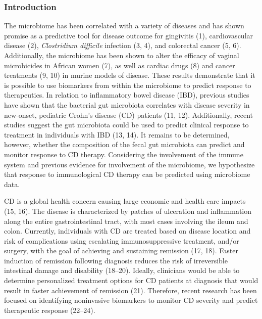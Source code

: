 \documentclass[12pt,]{article}
\begin{document}
\newpage

\subsubsection{Introduction}\label{introduction}

The microbiome has been correlated with a variety of diseases and has
shown promise as a predictive tool for disease outcome for gingivitis
(1), cardiovascular disease (2), \emph{Clostridium difficile} infection
(3, 4), and colorectal cancer (5, 6). Additionally, the microbiome has
been shown to alter the efficacy of vaginal microbicides in African
women (7), as well as cardiac drugs (8) and cancer treatments (9, 10) in
murine models of disease. These results demonstrate that it is possible
to use biomarkers from within the microbiome to predict response to
therapeutics. In relation to inflammatory bowel disease (IBD), previous
studies have shown that the bacterial gut microbiota correlates with
disease severity in new-onset, pediatric Crohn's disease (CD) patients
(11, 12). Additionally, recent studies suggest the gut microbiota could
be used to predict clinical response to treatment in individuals with
IBD (13, 14). It remains to be determined, however, whether the
composition of the fecal gut microbiota can predict and monitor response
to CD therapy. Considering the involvement of the immune system and
previous evidence for involvement of the microbiome, we hypothesize that
response to immunological CD therapy can be predicted using microbiome
data.

CD is a global health concern causing large economic and health care
impacts (15, 16). The disease is characterized by patches of ulceration
and inflammation along the entire gastrointestinal tract, with most
cases involving the ileum and colon. Currently, individuals with CD are
treated based on disease location and risk of complications using
escalating immunosuppressive treatment, and/or surgery, with the goal of
achieving and sustaining remission (17, 18). Faster induction of
remission following diagnosis reduces the risk of irreversible
intestinal damage and disability (18--20). Ideally, clinicians would be
able to determine personalized treatment options for CD patients at
diagnosis that would result in faster achievement of remission (21).
Therefore, recent research has been focused on identifying noninvasive
biomarkers to monitor CD severity and predict therapeutic response
(22--24).
\end{document}
